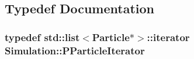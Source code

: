\subsection{Typedef Documentation}
\hypertarget{namespaceSimulation_a12159ab8aae83e7edd7a19bc93695340}{
\subsubsection[{P\-Particle\-Iterator}]{\setlength{\rightskip}{0pt plus 5cm}typedef std\-::list$<${\bf Particle}$\ast$$>$\-::iterator {\bf Simulation\-::\-P\-Particle\-Iterator}}}\label{namespaceSimulation_a12159ab8aae83e7edd7a19bc93695340}
